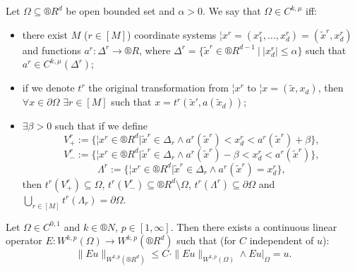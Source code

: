 \documentclass[12pt]{article}					%
\begin{document}
\begin{definice}
	Let $\Omega \subseteq ®R^d$ be open bounded set and $\alpha > 0$. We say that $\Omega \in C^{k, \mu}$ iff:

	\begin{itemize}
		\item there exist $M$ ($r \in [M]$) coordinate systems $¦x^r = (x_1^r, …, x_d^r) = (\tilde x^r, x_d^r)$ and functions $a^r: \Delta^r \rightarrow ®R$, where $\Delta^r = \{\tilde x^r \in ®R^{d - 1}\ |\ |x_d^r| ≤ \alpha\}$ such that $a^r \in C^{k, \mu}(\Delta^r)$;
		\item if we denote $t^r$ the original transformation from $¦x^r$ to $¦x = (\tilde x, x_d)$, then $\forall x \in \partial\Omega$ $\exists r \in [M]$ such that $x = t^r(\tilde x', a(\tilde x_d))$;
		\item $\exists \beta > 0$ such that if we define
			$$ V_+^r := \{¦x^r \in ®R^d | \tilde x^r \in \Delta_r \land a^r(\tilde x^r) < x_d^r < a^r(\tilde x^r) + \beta\}, $$
			$$ V_-^r := \{¦x^r \in ®R^d | \tilde x^r \in \Delta_r \land a^r(\tilde x^r) - \beta < x_d^r < a^r(\tilde x^r)\}, $$
			$$ \Lambda^r := \{¦x^r \in ®R^d | \tilde x^r \in \Delta_r \land a^r(\tilde x^r) = x_d^r\}, $$
			then $t^r(V_+^r) \subseteq \Omega$, $t^r(V_-^r) \subseteq ®R^d \setminus \Omega$, $t^r(\Lambda^r) \subseteq \partial \Omega$ and $\bigcup_{r\in[M]} t^r(\Lambda_r) = \partial \Omega$.
	\end{itemize}
\end{definice}

\begin{veta}
	Let $\Omega \in C^{0, 1}$ and $k \in ®N$, $p \in [1, ∞]$. Then there exists a continuous linear operator $E: W^{k, p}(\Omega) \rightarrow W^{k, p}(®R^d)$ such that (for $C$ independent of $u$):
	$$ \|E u\|_{W^{k, p}(®R^d)} ≤ C·\|E u\|_{W^{k, p}(\Omega)} \land E u |_\Omega = u. $$
\end{veta}
\end{document}
